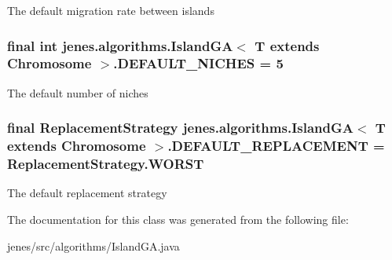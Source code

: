The default migration rate between islands \hypertarget{classjenes_1_1algorithms_1_1_island_g_a_3_01_t_01extends_01_chromosome_01_4_a37c9c99c1181aa1f194ad610bdb4d25f}{
\subsubsection[{D\-E\-F\-A\-U\-L\-T\-\_\-\-N\-I\-C\-H\-E\-S}]{\setlength{\rightskip}{0pt plus 5cm}final int jenes.\-algorithms.\-Island\-G\-A$<$ T extends Chromosome $>$.D\-E\-F\-A\-U\-L\-T\-\_\-\-N\-I\-C\-H\-E\-S = 5\hspace{0.3cm}{\ttfamily [static]}}}\label{classjenes_1_1algorithms_1_1_island_g_a_3_01_t_01extends_01_chromosome_01_4_a37c9c99c1181aa1f194ad610bdb4d25f}
The default number of niches \hypertarget{classjenes_1_1algorithms_1_1_island_g_a_3_01_t_01extends_01_chromosome_01_4_a1fc6944fd99215488896c76893d5f3d0}{
\subsubsection[{D\-E\-F\-A\-U\-L\-T\-\_\-\-R\-E\-P\-L\-A\-C\-E\-M\-E\-N\-T}]{\setlength{\rightskip}{0pt plus 5cm}final Replacement\-Strategy jenes.\-algorithms.\-Island\-G\-A$<$ T extends Chromosome $>$.D\-E\-F\-A\-U\-L\-T\-\_\-\-R\-E\-P\-L\-A\-C\-E\-M\-E\-N\-T = Replacement\-Strategy.\-W\-O\-R\-S\-T\hspace{0.3cm}{\ttfamily [static]}}}\label{classjenes_1_1algorithms_1_1_island_g_a_3_01_t_01extends_01_chromosome_01_4_a1fc6944fd99215488896c76893d5f3d0}
The default replacement strategy 

The documentation for this class was generated from the following file\-:\begin{DoxyCompactItemize}
\item 
jenes/src/algorithms/Island\-G\-A.\-java\end{DoxyCompactItemize}
